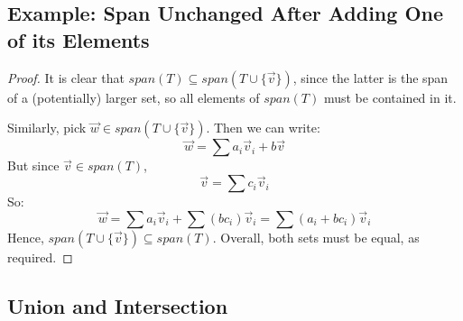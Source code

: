 \documentclass{exam}
\begin{document}
\subsection{Example: Span Unchanged After Adding One of its Elements}


\begin{proof}
It is clear that $span(T) \subseteq span(T \cup \{\vec{v}\})$, since the latter is the span of a (potentially) larger set, so all elements of $span(T)$ must be contained in it.

Similarly, pick $\vec{w} \in span(T \cup \{\vec{v}\})$. Then we can write:
\[
\vec{w} = \sum a_i \vec{v}_i + b\vec{v}
\]
But since $\vec{v} \in  span(T)$,
\[
\vec{v} = \sum c_i\vec{v}_i
\]
So:
\[
\vec{w} = \sum a_i \vec{v}_i + \sum (bc_i)\vec{v}_i = \sum (a_i + bc_i)\vec{v}_i
\]
Hence, $span(T \cup \{\vec{v}\}) \subseteq span(T)$. Overall, both sets must be equal, as required.
\end{proof}

\subsection{Union and Intersection}
\end{document}
